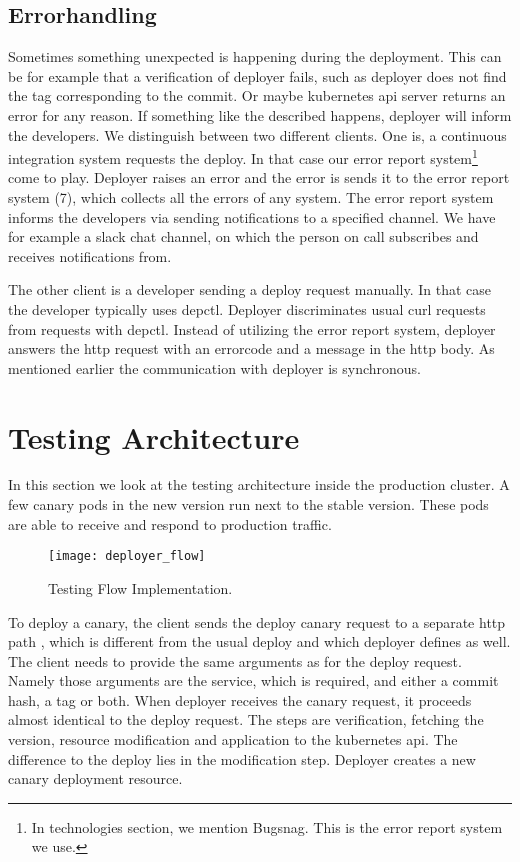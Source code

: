 \subsection{Errorhandling}

Sometimes something unexpected is happening during the deployment. This can be for example
that a verification of deployer fails, such as deployer does not find the tag
corresponding to the commit. Or maybe kubernetes api server returns an error for any
reason. If something like the described happens, deployer will inform the developers. We
distinguish between two different clients. One is, a continuous integration system
requests the deploy. In that case our error report system\footnote{In technologies
  section, we mention Bugsnag. This is the error report system we use.} come to
play. Deployer raises an error and the error is sends it to the error report system (7),
which collects all the errors of any system. The error report system informs the
developers via sending notifications to a specified channel. We have for example a slack
chat channel, on which the person on call subscribes and receives notifications from.

The other client is a developer sending a deploy request manually. In that case the
developer typically uses depctl. Deployer discriminates usual curl requests from requests
with depctl. Instead of utilizing the error report system, deployer answers the http
request with an errorcode and a message in the http body. As mentioned earlier the
communication with deployer is synchronous.

\section{Testing Architecture}

In this section we look at the testing architecture inside the production cluster. A few
canary pods in the new version run next to the stable version. These pods are able to
receive and respond to production traffic.

\begin{figure}[htbp] \centering \texttt{[image: deployer\_flow]}
  \caption[nprtflow]{Testing Flow Implementation.}
  \label{fig:testing_flow}
\end{figure}


To deploy a canary, the client sends the deploy canary request to a separate http path ,
which is different from the usual deploy and which deployer defines as well. The client
needs to provide the same arguments as for the deploy request. Namely those arguments are
the service, which is required, and either a commit hash, a tag or both. When deployer
receives the canary request, it proceeds almost identical to the deploy request. The steps
are verification, fetching the version, resource modification and application to the
kubernetes api. The difference to the deploy lies in the modification step. Deployer
creates a new canary deployment resource.

